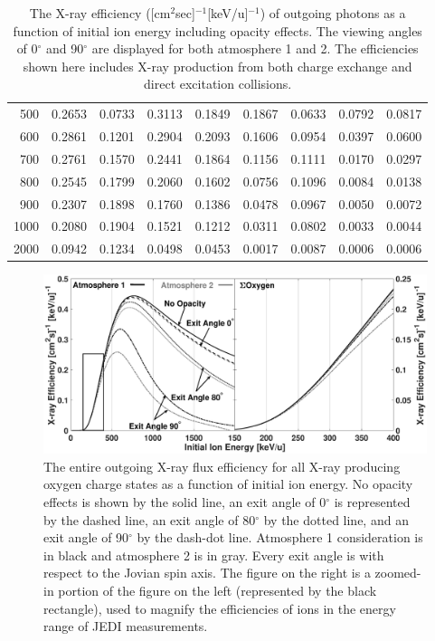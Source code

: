 \documentclass[draft]{agujournal2018}
\begin{document}
\begin{table}[ht]
\begin{tabular}{r|c|c|c|c|c|c|c|c}
    500      & 0.2653 & 0.0733 & 0.3113	& 0.1849 & 0.1867 & 0.0633 & 0.0792 & 0.0817 \\
    600      & 0.2861 & 0.1201 & 0.2904	& 0.2093 & 0.1606 & 0.0954 & 0.0397 & 0.0600 \\
    700      & 0.2761 & 0.1570 & 0.2441	& 0.1864 & 0.1156 & 0.1111 & 0.0170 & 0.0297 \\
    800      & 0.2545 & 0.1799 & 0.2060	& 0.1602 & 0.0756 & 0.1096 & 0.0084 & 0.0138 \\
    900      & 0.2307 & 0.1898 & 0.1760	& 0.1386 & 0.0478 & 0.0967 & 0.0050 & 0.0072 \\
    1000     & 0.2080 & 0.1904 & 0.1521	& 0.1212 & 0.0311 & 0.0802 & 0.0033 & 0.0044 \\
    2000     & 0.0942 & 0.1234 & 0.0498	& 0.0453 & 0.0017 & 0.0087 & 0.0006 & 0.0006 \\
    \hline
    \end{tabular}
    \caption{The X-ray efficiency ([cm$^2$sec]$^{-1}$[keV/u]$^{-1}$) of outgoing photons as a function of initial ion energy including opacity effects. The viewing angles of 0$^\circ$ and 90$^\circ$ are displayed for both atmosphere 1 and 2. The efficiencies shown here includes X-ray production from both charge exchange and direct excitation collisions.}
    \label{tab:XrayEff}
\end{table}

\begin{figure}[ht]
    \centering
    \includegraphics[width=\textwidth]{Figures/OxyXrayEff2.eps}
    \caption{The entire outgoing X-ray flux efficiency for all X-ray producing oxygen charge states as a function of initial ion energy. No opacity effects is shown by the solid line, an exit angle of 0$^{\circ}$ is represented by the dashed line, an exit angle of 80$^{\circ}$ by the dotted line, and an exit angle of 90$^{\circ}$ by the dash-dot line. Atmosphere 1 consideration is in black and atmosphere 2 is in gray. Every exit angle is with respect to the Jovian spin axis. The figure on the right is a zoomed-in portion of the figure on the left (represented by the black rectangle), used to magnify the efficiencies of ions in the energy range of JEDI measurements.}
    \label{fig:OxyXrayEff}
\end{figure}
\end{document}
